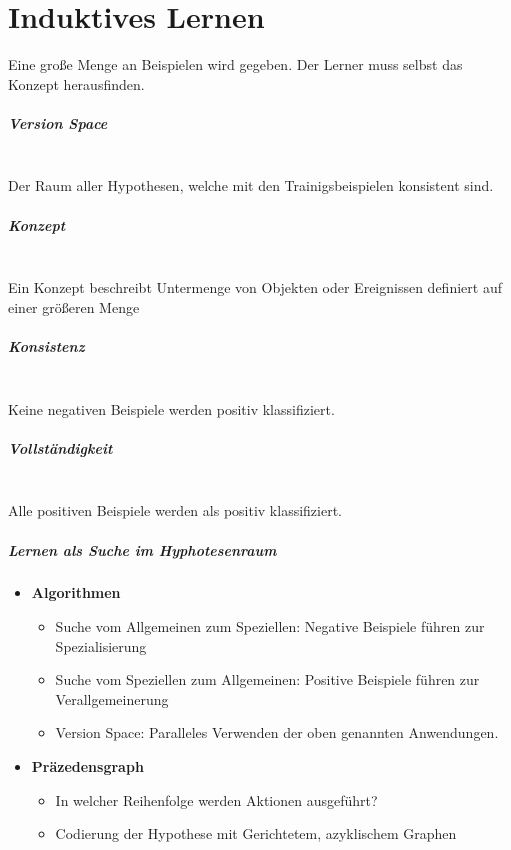 \chapter{Induktives Lernen}
Eine große Menge an Beispielen wird gegeben. Der Lerner muss selbst das Konzept herausfinden.

\paragraph{Version Space} \mbox{} \\
Der Raum aller Hypothesen, welche mit den Trainigsbeispielen konsistent sind.

\paragraph{Konzept} \mbox{} \\
Ein Konzept beschreibt Untermenge von Objekten oder Ereignissen definiert auf
einer größeren Menge

\paragraph{Konsistenz} \mbox{} \\
Keine negativen Beispiele werden positiv klassifiziert.

\paragraph{Vollständigkeit} \mbox{} \\
Alle positiven Beispiele werden als positiv klassifiziert.

\paragraph{Lernen als Suche im Hyphotesenraum} \mbox{}
\begin{itemize}
    \item \textbf{Algorithmen}
    \begin{itemize}
        \item Suche vom Allgemeinen zum Speziellen: Negative Beispiele führen zur
        Spezialisierung
        \item Suche vom Speziellen zum Allgemeinen: Positive Beispiele führen zur
        Verallgemeinerung
        \item Version Space: Paralleles Verwenden der oben genannten Anwendungen.
    \end{itemize}
    \item \textbf{Präzedensgraph}
    \begin{itemize}
        \item In welcher Reihenfolge werden Aktionen ausgeführt?
        \item Codierung der Hypothese mit Gerichtetem, azyklischem Graphen
    \end{itemize}
\end{itemize}

